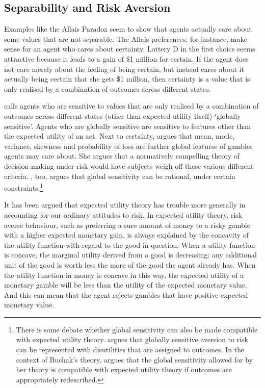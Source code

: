 \subsection{Separability and Risk Aversion}\label{subs53}

Examples like the Allais Paradox seem to show that agents actually care about some values that are not separable. The Allais preferences, for instance, make sense for an agent who cares about certainty. Lottery D in the first choice seems attractive because it leads to a gain of \$1 million for certain. If the agent does not care merely about the feeling of being certain, but instead cares about it actually being certain that she gets \$1 million, then certainty is a value that is only realised by a combination of outcomes across different states.

\citet{Buchak2013} calls agents who are sensitive to values that are only realised by a combination of outcomes across different states (other than expected utility itself) `globally sensitive'. Agents who are globally sensitive are sensitive to features other than the expected utility of an act. Next to certainty, \citet{Lopes1981, Lopes1996} argues that mean, mode, variance, skewness and probability of loss are further global features of gambles agents may care about. She argues that a normatively compelling theory of decision-making under risk would have subjects weigh off these various different criteria. \citet{Buchak2013}, too, argues that global sensitivity can be rational, under certain constraints.\footnote{There is some debate whether global sensitivity can also be made compatible with expected utility theory. \citet{Weirich1986} argues that globally sensitive aversion to risk can be represented with disutilities that are assigned to outcomes. In the context of Buchak's theory, \citet{Pettigrew2014} argues that the global sensitivity allowed for by her theory is compatible with expected utility theory if outcomes are appropriately redescribed.}

It has been argued that expected utility theory has trouble more generally in accounting for our ordinary attitudes to risk. In expected utility theory, risk averse behaviour, such as preferring a sure amount of money to a risky gamble with a higher expected monetary gain, is always explained by the concavity of the utility function with regard to the good in question. When a utility function is concave, the marginal utility derived from a good is decreasing: any additional unit of the good is worth less the more of the good the agent already has. When the utility function in money is concave in this way, the expected utility of a monetary gamble will be less than the utility of the expected monetary value. And this can mean that the agent rejects gambles that have positive expected monetary value.

